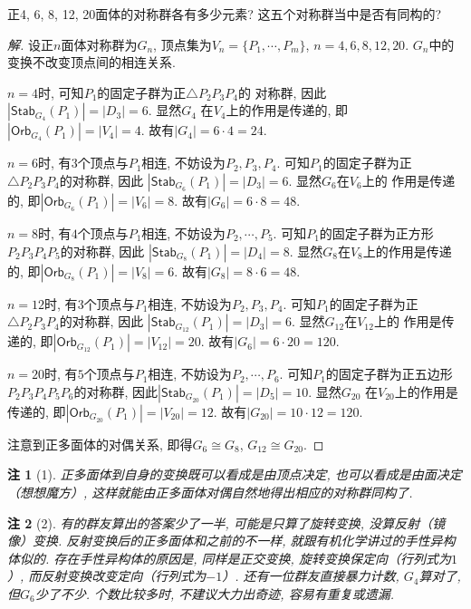 \documentclass[12pt, a4paper, fontset=windows]{ctexart}
\newcommand{\Orb}{\mathsf{Orb}}
\newcommand{\Stab}{\mathsf{Stab}}
\newcommand{\abs}[1]{\left|{#1}\right|}
\newcommand{\isom}{\cong} %
\newcommand{\kh}[1]{（{#1}）} %
\newtheorem*{remark}{注}
\newenvironment{solution}{\begin{proof}[解]}{\end{proof}}
\begin{document}
正4, 6, 8, 12, 20面体的对称群各有多少元素? 
这五个对称群当中是否有同构的? 

\begin{solution}
设正$n$面体对称群为$G_n$, 顶点集为$V_n=\{P_1,\cdots,P_m\}$, 
$n=4,6,8,12,20$. $G_n$中的变换不改变顶点间的相连关系. 

$n=4$时, 可知$P_1$的固定子群为正$\triangle P_2P_3P_4$的
对称群, 因此$\abs{\Stab_{G_4}(P_1)}=\abs{D_3}=6$. 显然$G_4$
在$V_4$上的作用是传递的, 即$\abs{\Orb_{G_4}(P_1)}=\abs{V_4}=4$. 故有$\abs{G_4}=6\cdot 4=24$. 

$n=6$时, 有$3$个顶点与$P_1$相连, 不妨设为$P_2,P_3,P_4$. 
可知$P_1$的固定子群为正$\triangle P_2P_3P_4$的对称群, 因此
$\abs{\Stab_{G_6}(P_1)}=\abs{D_3}=6$. 显然$G_6$在$V_6$上的
作用是传递的, 即$\abs{\Orb_{G_6}(P_1)}=\abs{V_6}=8$. 故有$\abs{G_6}=6\cdot 8=48$. 

$n=8$时, 有$4$个顶点与$P_1$相连, 不妨设为$P_2,\cdots,P_5$. 
可知$P_1$的固定子群为正方形$P_2P_3P_4P_5$的对称群, 因此
$\abs{\Stab_{G_8}(P_1)}=\abs{D_4}=8$. 显然$G_8$在$V_8$上的作用是传递的, 
即$\abs{\Orb_{G_8}(P_1)}=\abs{V_8}=6$. 故有$\abs{G_8}=8\cdot 6=48$. 

$n=12$时, 有$3$个顶点与$P_1$相连, 不妨设为$P_2,P_3,P_4$. 
可知$P_1$的固定子群为正$\triangle P_2P_3P_4$的对称群, 因此
$\abs{\Stab_{G_{12}}(P_1)}=\abs{D_3}=6$. 显然$G_{12}$在$V_{12}$上的
作用是传递的, 即$\abs{\Orb_{G_{12}}(P_1)}=\abs{V_{12}}=20$. 故有$\abs{G_6}=6\cdot 20=120$. 

$n=20$时, 有$5$个顶点与$P_1$相连, 不妨设为$P_2,\cdots,P_6$. 
可知$P_1$的固定子群为正五边形$P_2P_3P_4P_5P_6$的对称群, 
因此$\abs{\Stab_{G_{20}}(P_1)}=\abs{D_5}=10$. 显然$G_{20}$
在$V_{20}$上的作用是传递的, 即$\abs{\Orb_{G_{20}}(P_1)}=\abs{V_{20}}=12$. 
故有$\abs{G_{20}}=10\cdot 12=120$. 

注意到正多面体的对偶关系, 即得$G_6\isom G_8$, $G_{12}\isom G_{20}$. 
\end{solution}

\begin{remark}[1]
正多面体到自身的变换既可以看成是由顶点决定, 也可以看成是由面决定\kh{想想魔方}, 这样就能由正多面体对偶自然地得出相应的对称群同构了. 
\end{remark}

\begin{remark}[2]
有的群友算出的答案少了一半, 可能是只算了旋转变换, 没算反射\kh{镜像}变换. 
反射变换后的正多面体和之前的不一样, 就跟有机化学讲过的手性异构体似的. 
存在手性异构体的原因是, 同样是正交变换, 旋转变换保定向\kh{行列式为$1$}, 而反射变换改变定向\kh{行列式为$-1$}. 
还有一位群友直接暴力计数, $G_4$算对了, 但$G_6$少了不少. 
个数比较多时, 不建议大力出奇迹, 容易有重复或遗漏. 
\end{remark}
\end{document}
